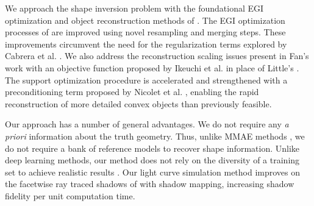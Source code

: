 We approach the shape inversion problem with the foundational EGI optimization and object reconstruction methods of \cite{kaasalainen2001,fan2020thesis}. The EGI optimization processes of \cite{fan2020thesis,cabrera2021,kaasalainen2001} are improved using novel resampling and merging steps. These improvements circumvent the need for the regularization terms explored by Cabrera et al. \cite{cabrera2021}. We also address the reconstruction scaling issues present in Fan's work \cite{fan2020thesis} with an objective function proposed by Ikeuchi et al. \cite{ikeuchi1981} in place of Little's \cite{little1985}. The support optimization procedure is accelerated and strengthened with a preconditioning term proposed by Nicolet et al. \cite{nicolet2021}, enabling the rapid reconstruction of more detailed convex objects than previously feasible.

Our approach has a number of general advantages. We do not require any \textit{a priori} information about the truth geometry. Thus, unlike MMAE methods \cite{linares2014space}, we do not require a bank of reference models to recover shape information. Unlike deep learning methods, our method does not rely on the diversity of a training set to achieve realistic results \cite{furfaro2019,kerr2021}. Our light curve simulation method improves on the facetwise ray traced shadows of \cite{kaasalainen2001,fan2020thesis,frueh2014} with shadow mapping, increasing shadow fidelity per unit computation time.

